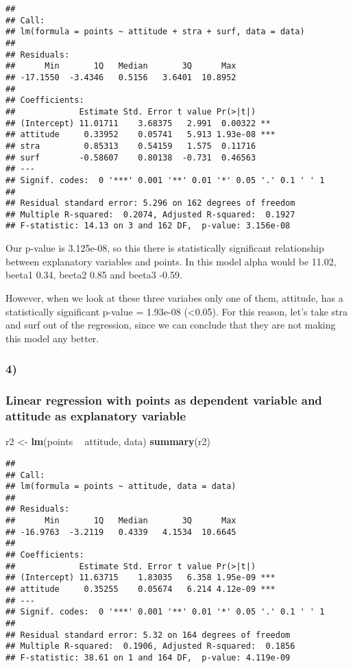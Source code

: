 \documentclass[]{article}
\newenvironment{Shaded}{\begin{snugshade}}{\end{snugshade}}
\newcommand{\KeywordTok}[1]{\textcolor[rgb]{0.13,0.29,0.53}{\textbf{#1}}}
\newcommand{\StringTok}[1]{\textcolor[rgb]{0.31,0.60,0.02}{#1}}
\newcommand{\OperatorTok}[1]{\textcolor[rgb]{0.81,0.36,0.00}{\textbf{#1}}}
\newcommand{\NormalTok}[1]{#1}
\begin{document}
\begin{verbatim}
## 
## Call:
## lm(formula = points ~ attitude + stra + surf, data = data)
## 
## Residuals:
##      Min       1Q   Median       3Q      Max 
## -17.1550  -3.4346   0.5156   3.6401  10.8952 
## 
## Coefficients:
##             Estimate Std. Error t value Pr(>|t|)    
## (Intercept) 11.01711    3.68375   2.991  0.00322 ** 
## attitude     0.33952    0.05741   5.913 1.93e-08 ***
## stra         0.85313    0.54159   1.575  0.11716    
## surf        -0.58607    0.80138  -0.731  0.46563    
## ---
## Signif. codes:  0 '***' 0.001 '**' 0.01 '*' 0.05 '.' 0.1 ' ' 1
## 
## Residual standard error: 5.296 on 162 degrees of freedom
## Multiple R-squared:  0.2074, Adjusted R-squared:  0.1927 
## F-statistic: 14.13 on 3 and 162 DF,  p-value: 3.156e-08
\end{verbatim}

Our p-value is 3.125e-08, so this there is statistically significant
relationship between explanatory variables and points. In this model
alpha would be 11.02, beeta1 0.34, beeta2 0.85 and beeta3 -0.59.

However, when we look at these three variabes only one of them,
attitude, has a statistically significant p-value = 1.93e-08
(\textless{}0.05). For this reason, let's take stra and surf out of the
regression, since we can conclude that they are not making this model
any better.

\subsubsection{4)}\label{section-3}

\subsubsection{Linear regression with points as dependent variable and
attitude as explanatory
variable}\label{linear-regression-with-points-as-dependent-variable-and-attitude-as-explanatory-variable}

\begin{Shaded}
\begin{Highlighting}[]
\NormalTok{r2 <-}\StringTok{ }\KeywordTok{lm}\NormalTok{(points }\OperatorTok{~}\StringTok{ }\NormalTok{attitude, data)}
\KeywordTok{summary}\NormalTok{(r2)}
\end{Highlighting}
\end{Shaded}

\begin{verbatim}
## 
## Call:
## lm(formula = points ~ attitude, data = data)
## 
## Residuals:
##      Min       1Q   Median       3Q      Max 
## -16.9763  -3.2119   0.4339   4.1534  10.6645 
## 
## Coefficients:
##             Estimate Std. Error t value Pr(>|t|)    
## (Intercept) 11.63715    1.83035   6.358 1.95e-09 ***
## attitude     0.35255    0.05674   6.214 4.12e-09 ***
## ---
## Signif. codes:  0 '***' 0.001 '**' 0.01 '*' 0.05 '.' 0.1 ' ' 1
## 
## Residual standard error: 5.32 on 164 degrees of freedom
## Multiple R-squared:  0.1906, Adjusted R-squared:  0.1856 
## F-statistic: 38.61 on 1 and 164 DF,  p-value: 4.119e-09
\end{verbatim}
\end{document}
